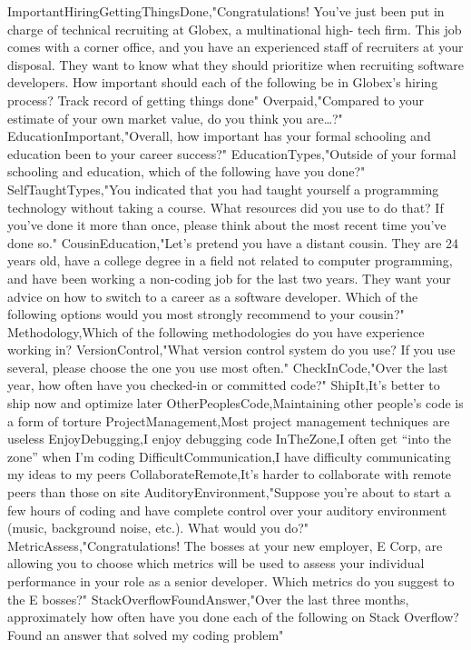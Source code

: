\begin{appendices}
ImportantHiringGettingThingsDone,"Congratulations! You've just been put in charge of technical recruiting at Globex, a multinational high- tech firm. This job comes with a corner office, and you have an experienced staff of recruiters at your disposal. They want to know what they should prioritize when recruiting software developers. How important should each of the following be in Globex's hiring process? Track record of getting things done"
Overpaid,"Compared to your estimate of your own market value, do you think you are…?"
EducationImportant,"Overall, how important has your formal schooling and education been to your career success?"
EducationTypes,"Outside of your formal schooling and education, which of the following have you done?"
SelfTaughtTypes,"You indicated that you had taught yourself a programming technology without taking a course. What resources did you use to do that? If you've done it more than once, please think about the most recent time you've done so."
CousinEducation,"Let's pretend you have a distant cousin. They are 24 years old, have a college degree in a field not related to computer programming, and have been working a non-coding job for the last two years. They want your advice on how to switch to a career as a software developer. Which of the following options would you most strongly recommend to your cousin?"
Methodology,Which of the following methodologies do you have experience working in?
VersionControl,"What version control system do you use? If you use several, please choose the one you use most often."
CheckInCode,"Over the last year, how often have you checked-in or committed code?"
ShipIt,It's better to ship now and optimize later
OtherPeoplesCode,Maintaining other people's code is a form of torture
ProjectManagement,Most project management techniques are useless
EnjoyDebugging,I enjoy debugging code
InTheZone,I often get “into the zone” when I'm coding
DifficultCommunication,I have difficulty communicating my ideas to my peers
CollaborateRemote,It's harder to collaborate with remote peers than those on site
AuditoryEnvironment,"Suppose you're about to start a few hours of coding and have complete control over your auditory environment (music, background noise, etc.). What would you do?"
MetricAssess,"Congratulations! The bosses at your new employer, E Corp, are allowing you to choose which metrics will be used to assess your individual performance in your role as a senior developer. Which metrics do you suggest to the E bosses?"
StackOverflowFoundAnswer,"Over the last three months, approximately how often have you done each of the following on Stack Overflow? Found an answer that solved my coding problem"

\end{appendices}

